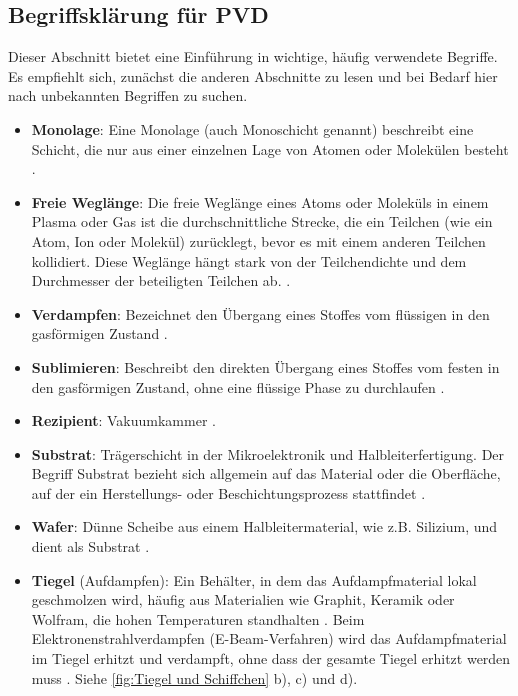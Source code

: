 \documentclass{article} %
\begin{document}
\subsection{Begriffsklärung für PVD} %
Dieser Abschnitt bietet eine Einführung in wichtige, häufig verwendete Begriffe. Es empfiehlt sich, zunächst die anderen Abschnitte zu lesen 
und bei Bedarf hier nach unbekannten Begriffen zu suchen.

\begin{itemize}
    \item \textbf{Monolage}: Eine Monolage (auch Monoschicht genannt) beschreibt eine Schicht, die nur aus einer einzelnen Lage von Atomen oder 
    Molekülen besteht \cite{kittel2004}.
    \item \textbf{Freie Weglänge}: Die freie Weglänge eines Atoms oder Moleküls in einem Plasma oder Gas ist die durchschnittliche Strecke, 
    die ein Teilchen (wie ein Atom, Ion oder Molekül) zurücklegt, bevor es mit einem anderen Teilchen kollidiert. Diese Weglänge hängt stark 
    von der Teilchendichte und dem Durchmesser der beteiligten Teilchen ab. \cite{kittel2004}.
    \item \textbf{Verdampfen}: Bezeichnet den Übergang eines Stoffes vom flüssigen in den gasförmigen Zustand \cite{kittel2004}.
    \item \textbf{Sublimieren}: Beschreibt den direkten Übergang eines Stoffes vom festen in den gasförmigen Zustand, ohne eine flüssige Phase 
    zu durchlaufen \cite{kittel2004}.
    \item \textbf{Rezipient}: Vakuumkammer \cite{keplinger2024, ohring2002}.
    \item \textbf{Substrat}: Trägerschicht in der Mikroelektronik und Halbleiterfertigung. Der Begriff Substrat bezieht sich allgemein auf das 
    Material oder die Oberfläche, auf der ein Herstellungs- oder Beschichtungsprozess stattfindet \cite{ohring2002}.
    \item \textbf{Wafer}: Dünne Scheibe aus einem Halbleitermaterial, wie z.B. Silizium, und dient als Substrat \cite{sze2006}.
    \item \textbf{Tiegel} (Aufdampfen): Ein Behälter, in dem das Aufdampfmaterial lokal geschmolzen wird, häufig aus Materialien wie Graphit, 
    Keramik oder Wolfram, die hohen Temperaturen standhalten \cite{smith1995, ohring2002}. Beim Elektronenstrahlverdampfen (E-Beam-Verfahren) wird das 
    Aufdampfmaterial im Tiegel erhitzt und verdampft, ohne dass der gesamte Tiegel erhitzt werden muss \cite{smith1995}. Siehe
    \autoref{fig:Tiegel und Schiffchen} b), c) und d).

\end{itemize}
\end{document}
